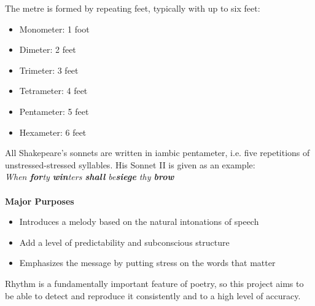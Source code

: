 The metre is formed by repeating feet, typically with up to six feet:
\begin{itemize}
\setlength{\itemsep}{0pt}
\item{Monometer: 1 foot}
\item{Dimeter: 2 feet}
\item{Trimeter: 3 feet}
\item{Tetrameter: 4 feet}
\item{Pentameter: 5 feet}
\item{Hexameter: 6 feet}
\end{itemize}

All Shakepeare's sonnets are written in iambic pentameter, i.e. five repetitions of unstressed-stressed syllables. His Sonnet II is given as an example:\\
\textit{When \textbf{for}ty \textbf{win}ters \textbf{shall} be\textbf{siege} thy \textbf{brow}}
\\\\
\textbf{Major Purposes}
\begin{itemize}
\item{Introduces a melody based on the natural intonations of speech} 
\item{Add a level of predictability and subconscious structure}
\item{Emphasizes the message by putting stress on the words that matter}
\end{itemize}

Rhythm is a fundamentally important feature of poetry, so this project aims to be able to detect and reproduce it consistently and to a high level of accuracy.

